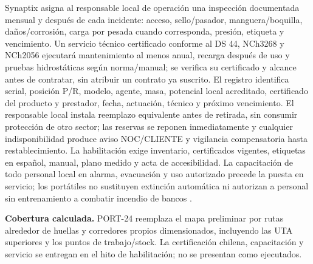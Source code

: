 Synaptix asigna al responsable local de operación una inspección documentada mensual y después de cada incidente: acceso, sello/pasador, manguera/boquilla, daños/corrosión, carga por pesada cuando corresponda, presión, etiqueta y vencimiento. Un servicio técnico certificado conforme al DS 44, NCh3268 y NCh2056 ejecutará mantenimiento al menos anual, recarga después de uso y pruebas hidrostáticas según norma/manual; se verifica su certificado y alcance antes de contratar, sin atribuir un contrato ya suscrito. El registro identifica serial, posición P/R, modelo, agente, masa, potencial local acreditado, certificado del producto y prestador, fecha, actuación, técnico y próximo vencimiento. El responsable local instala reemplazo equivalente antes de retirada, sin consumir protección de otro sector; las reservas se reponen inmediatamente y cualquier indisponibilidad produce aviso NOC/CLIENTE y vigilancia compensatoria hasta restablecimiento. La habilitación exige inventario, certificados vigentes, etiquetas en español, manual, plano medido y acta de accesibilidad. La capacitación de todo personal local en alarma, evacuación y uso autorizado precede la puesta en servicio; los portátiles no sustituyen extinción automática ni autorizan a personal sin entrenamiento a combatir incendio de bancos \parencites[arts.~23--30/32--33]{l21-ds44}[arts.~48/51]{l21-ds594}.

\textbf{Cobertura calculada.} PORT-24 reemplaza el mapa preliminar por rutas alrededor de huellas y corredores propios dimensionados, incluyendo las UTA superiores y los puntos de trabajo/stock. La certificación chilena, capacitación y servicio se entregan en el hito de habilitación; no se presentan como ejecutados.

